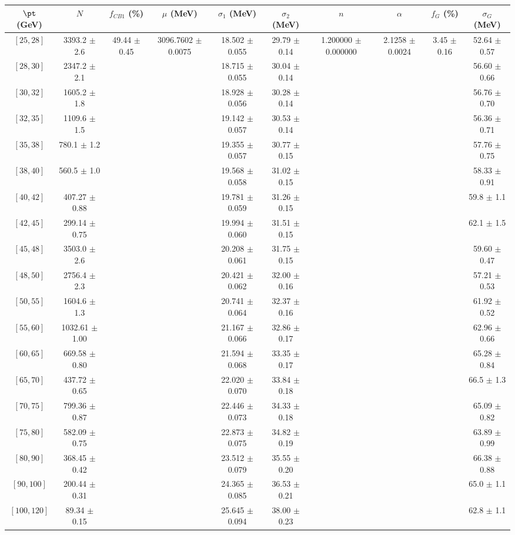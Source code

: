 \begin{tabular}{c||c|c|c|c|c|c|c|c|c}
$\pt$ (GeV) & $N$ & $f_{CB1}$ (\%)  & $\mu$ (MeV) & $\sigma_1$ (MeV) & $\sigma_2$ (MeV) & $n$ & $\alpha$ & $f_G$ (\%) & $\sigma_G$ (MeV) \\
\hline
$[25, 28]$ & 3393.2 $\pm$ 2.6 & \multirow{19}{*}{49.44 $\pm$ 0.45} & \multirow{19}{*}{3096.7602 $\pm$ 0.0075} & 18.502 $\pm$ 0.055 & 29.79 $\pm$ 0.14 & \multirow{19}{*}{1.200000 $\pm$ 0.000000} & \multirow{19}{*}{2.1258 $\pm$ 0.0024} & \multirow{19}{*}{3.45 $\pm$ 0.16} & 52.64 $\pm$ 0.57\\
$[28, 30]$ & 2347.2 $\pm$ 2.1 &  &  & 18.715 $\pm$ 0.055 & 30.04 $\pm$ 0.14 &  &  &  & 56.60 $\pm$ 0.66\\
$[30, 32]$ & 1605.2 $\pm$ 1.8 &  &  & 18.928 $\pm$ 0.056 & 30.28 $\pm$ 0.14 &  &  &  & 56.76 $\pm$ 0.70\\
$[32, 35]$ & 1109.6 $\pm$ 1.5 &  &  & 19.142 $\pm$ 0.057 & 30.53 $\pm$ 0.14 &  &  &  & 56.36 $\pm$ 0.71\\
$[35, 38]$ & 780.1 $\pm$ 1.2 &  &  & 19.355 $\pm$ 0.057 & 30.77 $\pm$ 0.15 &  &  &  & 57.76 $\pm$ 0.75\\
$[38, 40]$ & 560.5 $\pm$ 1.0 &  &  & 19.568 $\pm$ 0.058 & 31.02 $\pm$ 0.15 &  &  &  & 58.33 $\pm$ 0.91\\
$[40, 42]$ & 407.27 $\pm$ 0.88 &  &  & 19.781 $\pm$ 0.059 & 31.26 $\pm$ 0.15 &  &  &  & 59.8 $\pm$ 1.1\\
$[42, 45]$ & 299.14 $\pm$ 0.75 &  &  & 19.994 $\pm$ 0.060 & 31.51 $\pm$ 0.15 &  &  &  & 62.1 $\pm$ 1.5\\
$[45, 48]$ & 3503.0 $\pm$ 2.6 &  &  & 20.208 $\pm$ 0.061 & 31.75 $\pm$ 0.15 &  &  &  & 59.60 $\pm$ 0.47\\
$[48, 50]$ & 2756.4 $\pm$ 2.3 &  &  & 20.421 $\pm$ 0.062 & 32.00 $\pm$ 0.16 &  &  &  & 57.21 $\pm$ 0.53\\
$[50, 55]$ & 1604.6 $\pm$ 1.3 &  &  & 20.741 $\pm$ 0.064 & 32.37 $\pm$ 0.16 &  &  &  & 61.92 $\pm$ 0.52\\
$[55, 60]$ & 1032.61 $\pm$ 1.00 &  &  & 21.167 $\pm$ 0.066 & 32.86 $\pm$ 0.17 &  &  &  & 62.96 $\pm$ 0.66\\
$[60, 65]$ & 669.58 $\pm$ 0.80 &  &  & 21.594 $\pm$ 0.068 & 33.35 $\pm$ 0.17 &  &  &  & 65.28 $\pm$ 0.84\\
$[65, 70]$ & 437.72 $\pm$ 0.65 &  &  & 22.020 $\pm$ 0.070 & 33.84 $\pm$ 0.18 &  &  &  & 66.5 $\pm$ 1.3\\
$[70, 75]$ & 799.36 $\pm$ 0.87 &  &  & 22.446 $\pm$ 0.073 & 34.33 $\pm$ 0.18 &  &  &  & 65.09 $\pm$ 0.82\\
$[75, 80]$ & 582.09 $\pm$ 0.75 &  &  & 22.873 $\pm$ 0.075 & 34.82 $\pm$ 0.19 &  &  &  & 63.89 $\pm$ 0.99\\
$[80, 90]$ & 368.45 $\pm$ 0.42 &  &  & 23.512 $\pm$ 0.079 & 35.55 $\pm$ 0.20 &  &  &  & 66.38 $\pm$ 0.88\\
$[90, 100]$ & 200.44 $\pm$ 0.31 &  &  & 24.365 $\pm$ 0.085 & 36.53 $\pm$ 0.21 &  &  &  & 65.0 $\pm$ 1.1\\
$[100, 120]$ & 89.34 $\pm$ 0.15 &  &  & 25.645 $\pm$ 0.094 & 38.00 $\pm$ 0.23 &  &  &  & 62.8 $\pm$ 1.1\\
\end{tabular}
